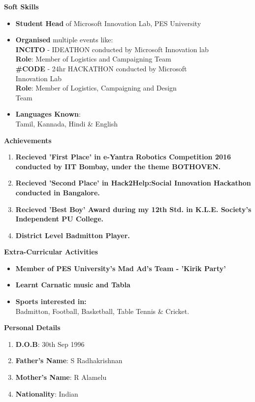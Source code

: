 \documentclass[a4paper,12pt,final]{memoir}
\newcommand{\Sep}{\vspace{1.5em}}
\newcommand{\SmallSep}{\vspace{0.5em}}
\newcommand\tab[1][1cm]{\hspace*{#1}}
\newcommand{\CVSection}[1]
{\Large\textbf{#1}\par
	\SmallSep\normalsize\normalfont}
\begin{document}
	\CVSection{Soft Skills}
		\begin{itemize}
			\item \textbf{Student Head} of Microsoft Innovation Lab, PES University
			\item \textbf{Organised} multiple events like:\\
			\tab \textbf{INCITO} - IDEATHON conducted by Microsoft Innovation lab\\
			\tab \tab \textbf{Role}: Member of Logistics and Campaigning Team\\
			\clearpage
			\framebreak
			\framebreak
			\tab \textbf{\#CODE} - 24hr HACKATHON conducted by Microsoft \\\tab \tab Innovation Lab\\
			\tab \tab \textbf{Role}: Member of Logistics, Campaigning and Design\\\tab \tab Team
			\item \textbf{Languages Known}:\\
			\tab Tamil, Kannada, Hindi \& English
			 
		\end{itemize}
	\Sep
	
	\CVSection{Achievements}
		\begin{enumerate}
			\item \textbf{Recieved 'First Place' in e-Yantra Robotics Competition 2016 conducted by IIT Bombay, under the theme BOTHOVEN.}
			\item \textbf{Recieved 'Second Place' in Hack2Help:Social Innovation Hackathon conducted in Bangalore.}
			\item \textbf{Recieved 'Best Boy' Award during my 12th Std. in K.L.E. Society's Independent PU College.}
			\item \textbf{District Level Badmitton Player.}
		\end{enumerate}
	\Sep
	
	\CVSection{Extra-Curricular Activities}
		\begin{itemize}
			\item \textbf{Member of PES University's Mad Ad's Team - 'Kirik Party'}
			\item \textbf{Learnt Carnatic music and Tabla}
			\item \textbf{Sports interested in:}\\
			\tab Badmitton, Football, Basketball, Table Tennis \& Cricket.
		\end{itemize}
	\Sep
	
	\CVSection{Personal Details}
		\begin{enumerate}
			\item \textbf{D.O.B}: 30th Sep 1996
			\item \textbf{Father's Name}: S Radhakrishnan
			\item \textbf{Mother's Name}: R Alamelu
			\item \textbf{Nationality}: Indian
		\end{enumerate}
	\Sep
\end{document}
